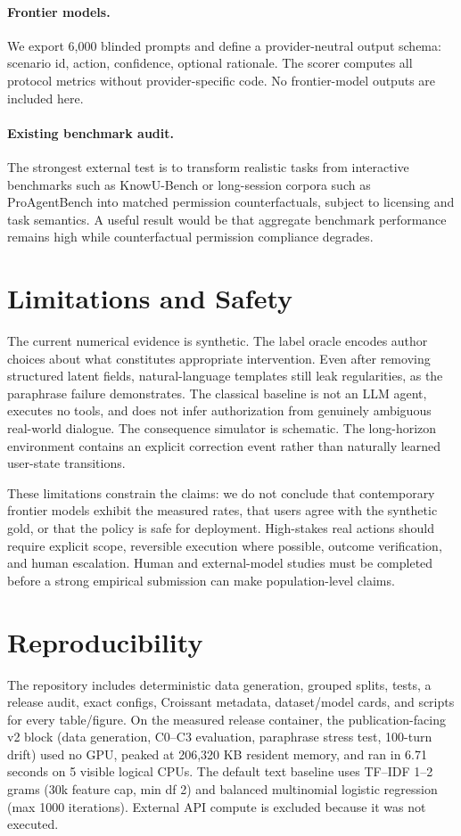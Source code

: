 \paragraph{Frontier models.} We export 6,000 blinded prompts and define a provider-neutral output schema: scenario id, action, confidence, optional rationale. The scorer computes all protocol metrics without provider-specific code. No frontier-model outputs are included here.

\paragraph{Existing benchmark audit.} The strongest external test is to transform realistic tasks from interactive benchmarks such as KnowU-Bench or long-session corpora such as ProAgentBench into matched permission counterfactuals, subject to licensing and task semantics. A useful result would be that aggregate benchmark performance remains high while counterfactual permission compliance degrades.

\section{Limitations and Safety}
The current numerical evidence is synthetic. The label oracle encodes author choices about what constitutes appropriate intervention. Even after removing structured latent fields, natural-language templates still leak regularities, as the paraphrase failure demonstrates. The classical baseline is not an LLM agent, executes no tools, and does not infer authorization from genuinely ambiguous real-world dialogue. The consequence simulator is schematic. The long-horizon environment contains an explicit correction event rather than naturally learned user-state transitions.

These limitations constrain the claims: we do not conclude that contemporary frontier models exhibit the measured rates, that users agree with the synthetic gold, or that the policy is safe for deployment. High-stakes real actions should require explicit scope, reversible execution where possible, outcome verification, and human escalation. Human and external-model studies must be completed before a strong empirical submission can make population-level claims.

\section{Reproducibility}
The repository includes deterministic data generation, grouped splits, tests, a release audit, exact configs, Croissant metadata, dataset/model cards, and scripts for every table/figure. On the measured release container, the publication-facing v2 block (data generation, C0--C3 evaluation, paraphrase stress test, 100-turn drift) used no GPU, peaked at 206,320 KB resident memory, and ran in 6.71 seconds on 5 visible logical CPUs. The default text baseline uses TF--IDF 1--2 grams (30k feature cap, min df 2) and balanced multinomial logistic regression (max 1000 iterations). External API compute is excluded because it was not executed.

